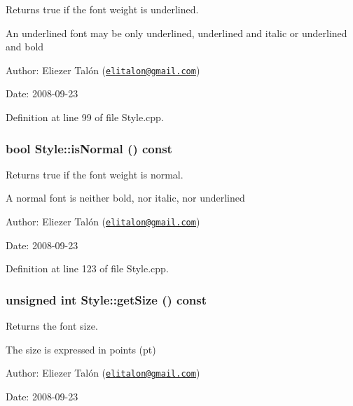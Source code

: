 Returns true if the font weight is underlined. 

An underlined font may be only underlined, underlined and italic or underlined and bold

\begin{Desc}
\item[Author:]Eliezer Talón (\href{mailto:elitalon@gmail.com}{\tt elitalon@gmail.com}) \end{Desc}
\begin{Desc}
\item[Date:]2008-09-23 \end{Desc}


Definition at line 99 of file Style.cpp.\hypertarget{class_style_db2cbc7ca50b2f5c632c8e9b0420044c}{
\subsubsection[isNormal]{\setlength{\rightskip}{0pt plus 5cm}bool Style::isNormal () const}}
\label{class_style_db2cbc7ca50b2f5c632c8e9b0420044c}


Returns true if the font weight is normal. 

A normal font is neither bold, nor italic, nor underlined

\begin{Desc}
\item[Author:]Eliezer Talón (\href{mailto:elitalon@gmail.com}{\tt elitalon@gmail.com}) \end{Desc}
\begin{Desc}
\item[Date:]2008-09-23 \end{Desc}


Definition at line 123 of file Style.cpp.\hypertarget{class_style_9356c4a5d30f4e0f5c86f8c8b3f36cd2}{
\subsubsection[getSize]{\setlength{\rightskip}{0pt plus 5cm}unsigned int Style::getSize () const}}
\label{class_style_9356c4a5d30f4e0f5c86f8c8b3f36cd2}


Returns the font size. 

The size is expressed in points (pt)

\begin{Desc}
\item[Author:]Eliezer Talón (\href{mailto:elitalon@gmail.com}{\tt elitalon@gmail.com}) \end{Desc}
\begin{Desc}
\item[Date:]2008-09-23 \end{Desc}


